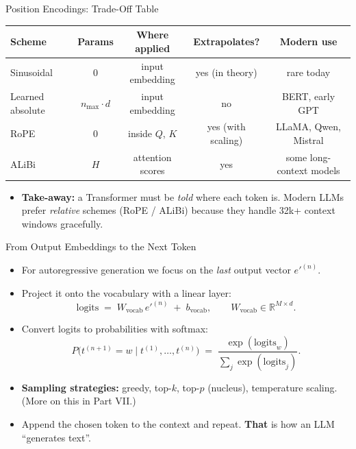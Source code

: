 \begin{frame}{Position Encodings: Trade-Off Table}
\begin{center}
\renewcommand{\arraystretch}{1.25}
\begin{tabular}{l c c c c}
\toprule
\textbf{Scheme} & \textbf{Params} & \textbf{Where applied} & \textbf{Extrapolates?} & \textbf{Modern use} \\
\midrule
Sinusoidal       & 0       & input embedding & yes (in theory) & rare today \\
Learned absolute & $n_{\max}\!\cdot\! d$ & input embedding & no & BERT, early GPT \\
RoPE             & 0       & inside $Q$, $K$ & yes (with scaling) & LLaMA, Qwen, Mistral \\
ALiBi            & $H$     & attention scores & yes & some long-context models \\
\bottomrule
\end{tabular}
\end{center}

\medskip
\begin{itemize}
\item \textbf{Take-away:} a Transformer must be \emph{told} where each token is. Modern LLMs prefer \emph{relative} schemes (RoPE / ALiBi) because they handle 32k+ context windows gracefully.
\end{itemize}
\end{frame}

\begin{frame}{From Output Embeddings to the Next Token}
\begin{itemize}
\item For autoregressive generation we focus on the \emph{last} output vector $e'^{(n)}$.

\medskip
\item Project it onto the vocabulary with a linear layer:
\[
   \text{logits} \;=\; W_{\text{vocab}}\, e'^{(n)} \;+\; b_{\text{vocab}}, \qquad W_{\text{vocab}} \in \mathbb{R}^{M \times d}.
\]

\medskip
\item Convert logits to probabilities with softmax:
\[
   P\bigl(t^{(n+1)} = w \mid t^{(1)}, \ldots, t^{(n)}\bigr) \;=\; \frac{\exp(\text{logits}_{w})}{\sum_{j} \exp(\text{logits}_{j})}.
\]

\medskip
\item \textbf{Sampling strategies:} greedy, top-$k$, top-$p$ (nucleus), temperature scaling. (More on this in Part VII.)

\medskip
\item Append the chosen token to the context and repeat. \textbf{That} is how an LLM ``generates text''.
\end{itemize}
\end{frame}

